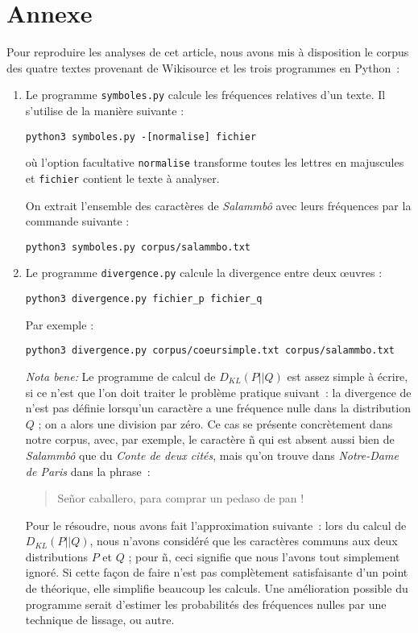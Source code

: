 \documentclass[]{article}
\begin{document}
\section*{Annexe}
Pour reproduire les analyses de cet article, nous avons mis à disposition le corpus des quatre textes provenant de Wikisource et les trois programmes en Python~:

\begin{enumerate}
\item Le programme \verb=symboles.py= calcule les fréquences relatives d'un texte. Il s'utilise de la manière suivante :
\begin{verbatim}
python3 symboles.py -[normalise] fichier
\end{verbatim}
où l'option facultative \verb=normalise= transforme toutes les lettres en majuscules et \verb=fichier= contient le texte à analyser.

On extrait l'ensemble des caractères de \textit{Salammbô} avec leurs fréquences par la commande suivante :
\begin{verbatim}
python3 symboles.py corpus/salammbo.txt
\end{verbatim}

\item Le programme \verb=divergence.py= calcule la divergence entre deux œuvres :
\begin{verbatim}
python3 divergence.py fichier_p fichier_q
\end{verbatim}
Par exemple :
\begin{verbatim}
python3 divergence.py corpus/coeursimple.txt corpus/salammbo.txt
\end{verbatim}
\textit{Nota bene:} Le programme de calcul de $D_{KL}(P||Q)$ est assez simple à écrire, si ce n'est que l'on doit traiter le problème pratique suivant~: la divergence de \citeauthor{Kullback1951} n'est pas définie lorsqu'un caractère a une fréquence nulle dans la distribution $Q$ ; on a alors une division par zéro. Ce cas se présente concrètement dans notre corpus, avec, par exemple, le caractère ñ qui est absent aussi bien de  \textit{Salammbô} que du  \textit{Conte de deux cités}, mais qu'on trouve dans \textit{Notre-Dame de Paris} dans la phrase~:
\begin{quote}
Señor caballero, para comprar un pedaso de pan !
\end{quote}
Pour le résoudre, nous avons fait l'approximation suivante~: lors du calcul de $D_{KL}(P||Q)$, nous n'avons considéré que les caractères communs aux deux distributions $P$ et $Q$ ; pour ñ, ceci signifie que nous l'avons tout simplement ignoré. Si cette façon de faire n'est pas complètement satisfaisante d'un point de théorique, elle simplifie beaucoup les calculs. Une amélioration possible du programme serait d'estimer les probabilités des fréquences nulles par une technique de lissage, \citet{Laplace1820} ou autre.


\end{enumerate}
\end{document}
